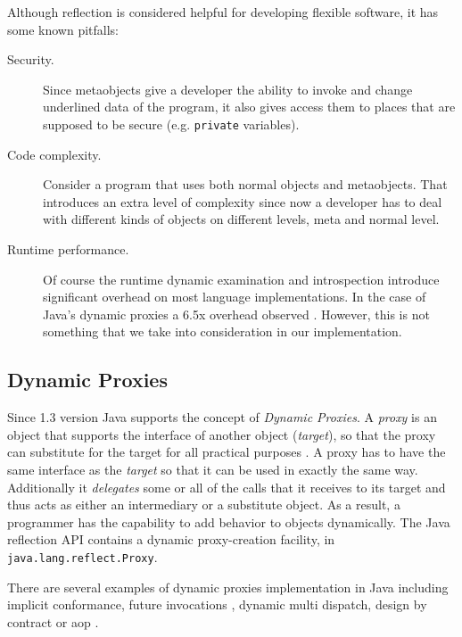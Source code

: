Although reflection is considered helpful for developing flexible software, it has some known pitfalls:

\begin{description}
	
	\item[Security.] Since metaobjects give a developer the ability to invoke and change underlined data of the program, it also gives access them to places that are supposed to be secure (e.g. \texttt{private} variables).

	\item[Code complexity.] Consider a program that uses both normal objects and metaobjects. 
	That introduces an extra level of complexity since now a developer has to deal with different kinds of objects on different levels, meta and normal level.

	\item[Runtime performance.] Of course the runtime dynamic examination and introspection introduce significant overhead on most language implementations. 
	In the case of Java's dynamic proxies a 6.5x overhead observed \cite{marr2015zero}. 
	However, this is not something that we take into consideration in our implementation.

\end{description}

\subsection{Dynamic Proxies}\label{Dynamic Proxies}
Since 1.3 version Java supports the concept of \textit{Dynamic Proxies}.
A \textit{proxy} is an object that supports the interface of another object (\textit{target}), so that the proxy can substitute for the target for all practical purposes \cite{forman2004java}.
A proxy has to have the same interface as the \textit{target} so that it can be used in exactly the same way. 
Additionally it \textit{delegates} some or all of the calls that it receives to its target and thus acts as either an intermediary or a substitute object.
As a result, a programmer has the capability to add behavior to objects dynamically. 
The Java reflection API contains a dynamic proxy-creation facility, in \texttt{java.lang.reflect.Proxy}.

There are several examples of dynamic proxies implementation in Java including implicit conformance, future invocations \cite{pratikakis2004transparent}, dynamic multi dispatch, design by contract or \ac{aop} \cite{eugster2006uniform}.

